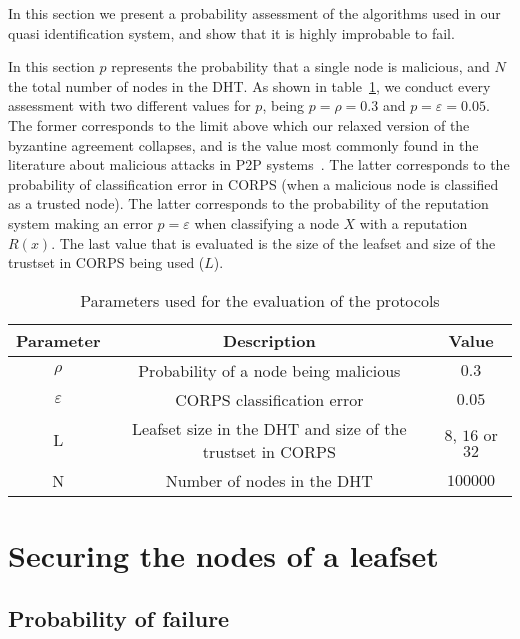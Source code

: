In this section we present a probability assessment of
the algorithms used in our quasi identification system, and show that it is highly
improbable to fail.

In this section $p$ represents the probability that a single node is
malicious, and $N$ the total number of nodes in the DHT.
As shown in table~\ref{tab:variables_used}, we conduct every
assessment with two different values for $p$, being $p = \rho = 0.3$ and $p = \varepsilon =  0.05$.
The former corresponds to the limit above which our relaxed version of the
byzantine agreement collapses, and is the value most
commonly found in the literature about malicious attacks in P2P
systems~\cite{p2p_certification}. The latter corresponds to the probability of
classification error in CORPS (when a malicious node is classified as a trusted node).
The latter corresponds to the probability of the reputation system making an error $p = \varepsilon$ when classifying a
node $X$ with a reputation $R(x)$. The last  value that is evaluated is the
size of the leafset and size of the trustset in CORPS being used ($L$).


  \begin{table}
    \centering
    \footnotesize
    \begin{tabular}{|ccc|}
      \hline
      \textbf{Parameter} & \textbf{Description} & \textbf{Value} \\
      \hline
      $\rho$ &  Probability of a node being malicious  & $0.3$  \\
      $\varepsilon$& CORPS classification error   & $0.05$ \\
      L &  Leafset size in the DHT and size of the trustset in CORPS  & $8$, $16$ or $32$  \\
      N &  Number of nodes in the DHT & $100000$  \\
      \hline
    \end{tabular}
    \caption{Parameters used for the evaluation of the protocols}
    \label{tab:variables_used}
  \end{table}




\section{Securing the nodes of a leafset}
\label{sec:eval_leafset}
  
  \subsection{Probability of failure}
  
